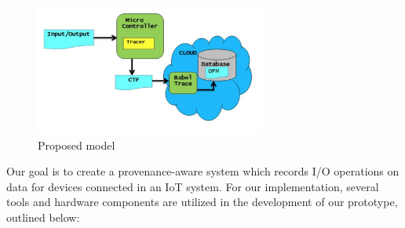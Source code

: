 \begin{figure}[h]
\begin{center}

\includegraphics[width =3.0in]{architecture.PNG}    
\end{center}
\caption{Proposed model}
\label{architecture}
\end{figure}

Our goal is to create a provenance-aware system which records I/O operations on data for devices connected in an IoT system. For our implementation, several tools and hardware components are utilized in the development of our prototype, outlined below:

